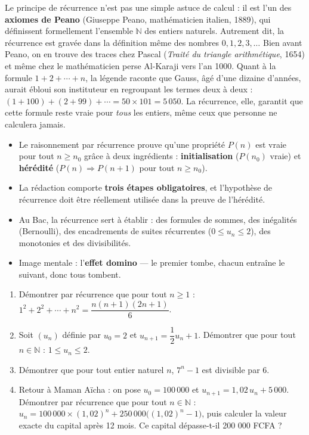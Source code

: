 \documentclass[11pt]{article}
\begin{document}
\begin{savaistu}
Le principe de récurrence n'est pas une simple astuce de calcul : il est l'un des \textbf{axiomes de Peano} (Giuseppe Peano, mathématicien italien, 1889), qui définissent formellement l'ensemble $\mathbb{N}$ des entiers naturels. Autrement dit, la récurrence est gravée dans la définition même des nombres $0, 1, 2, 3, \ldots$ Bien avant Peano, on en trouve des traces chez Pascal (\emph{Traité du triangle arithmétique}, 1654) et même chez le mathématicien perse Al-Karaji vers l'an 1000. Quant à la formule $1 + 2 + \cdots + n$, la légende raconte que Gauss, âgé d'une dizaine d'années, aurait ébloui son instituteur en regroupant les termes deux à deux : $(1 + 100) + (2 + 99) + \cdots = 50 \times 101 = 5\,050$. La récurrence, elle, garantit que cette formule reste vraie pour \emph{tous} les entiers, même ceux que personne ne calculera jamais.
\end{savaistu}

\begin{aretenir}
\begin{itemize}
\item Le raisonnement par récurrence prouve qu'une propriété $P(n)$ est vraie pour tout $n \geq n_0$ grâce à deux ingrédients : \textbf{initialisation} ($P(n_0)$ vraie) et \textbf{hérédité} ($P(n) \Rightarrow P(n+1)$ pour tout $n \geq n_0$).
\item La rédaction comporte \textbf{trois étapes obligatoires}, et l'hypothèse de récurrence doit être réellement utilisée dans la preuve de l'hérédité.
\item Au Bac, la récurrence sert à établir : des formules de sommes, des inégalités (Bernoulli), des encadrements de suites récurrentes ($0 \leq u_n \leq 2$), des monotonies et des divisibilités.
\item Image mentale : l'\textbf{effet domino} — le premier tombe, chacun entraîne le suivant, donc tous tombent.
\end{itemize}
\end{aretenir}

\begin{exercice}
\begin{enumerate}
\item Démontrer par récurrence que pour tout $n \geq 1$ : $1^2 + 2^2 + \cdots + n^2 = \dfrac{n(n+1)(2n+1)}{6}$.
\item Soit $(u_n)$ définie par $u_0 = 2$ et $u_{n+1} = \dfrac{1}{2}u_n + 1$. Démontrer que pour tout $n \in \mathbb{N}$ : $1 \leq u_n \leq 2$.
\item Démontrer que pour tout entier naturel $n$, $7^n - 1$ est divisible par $6$.
\item Retour à Maman Aïcha : on pose $u_0 = 100\,000$ et $u_{n+1} = 1{,}02\,u_n + 5\,000$. Démontrer par récurrence que pour tout $n \in \mathbb{N}$ : $u_n = 100\,000 \times (1{,}02)^n + 250\,000\big((1{,}02)^n - 1\big)$, puis calculer la valeur exacte du capital après 12 mois. Ce capital dépasse-t-il 200 000 FCFA ?
\end{enumerate}
\end{exercice}
\end{document}
